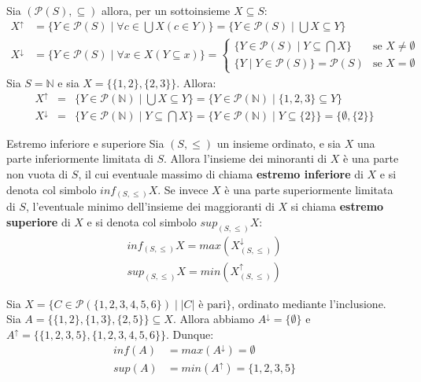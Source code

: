 \begin{example}
	Sia $(\mathcal{P}(S),\subseteq)$ allora, per un sottoinsieme $X \subseteq S$:
	\begin{eqnarray}
			X^{\uparrow} &= \{ Y \in \mathcal{P}(S) \; | \; \forall c \in \bigcup X (c \in Y) \} = \{Y \in \mathcal{P}(S) \; | \; \bigcup X \subseteq Y \}\\
			X^{\downarrow} &= \{Y \in \mathcal{P}(S) \; | \; \forall x \in X (Y \subseteq x )\} = \begin{cases}
				\{Y \in \mathcal{P}(S) \; | \; Y \subseteq \bigcap X\} & \text{se $X \neq \emptyset$}\\
				\{Y \; | \; Y \in \mathcal{P}(S) \} = \mathcal{P}(S) & \text{se $X= \emptyset$}
			\end{cases}
	\end{eqnarray}
Sia $S= \mathbb{N}$ e sia $X= \{\{1,2\},\{2,3\}\}$. Allora:
\begin{align*}
	X^{\uparrow} &=& \{Y \in \mathcal{P}(\mathbb{N}) \; | \; \bigcup X \subseteq Y \} = \{Y 	\in \mathcal{P}(\mathbb{N}) \; | \; \{1,2,3\} \subseteq Y \}\\
	X^{\downarrow} &=& \{Y \in \mathcal{P}(\mathbb{N})\; | \; Y \subseteq \bigcap X\} = \{Y \in \mathcal{P}(\mathbb{N}) \; | \; Y \subseteq \{2\} \} = \{\emptyset, \{2\}\}
\end{align*}
\end{example}

\begin{defbox}{Estremo inferiore e superiore}
	Sia $(S,\leq)$ un insieme ordinato, e sia $X$ una parte inferiormente limitata di $S$. Allora l'insieme dei minoranti di $X$ è una parte non vuota di $S$, il cui eventuale massimo di chiama \textbf{estremo inferiore} di $X$ e si denota col simbolo $inf_{(S,\leq)} X$. Se invece $X$ è una parte superiormente limitata di $S$, l'eventuale minimo dell'insieme dei maggioranti di $X$ si chiama \textbf{estremo superiore} di $X$ e si denota col simbolo $sup_{(S,\leq)} X$:
	\begin{eqnarray}
		inf_{(S,\leq)} X = max(X^{\downarrow}_{(S,\leq)})\\
		sup_{(S,\leq)} X = min(X^{\uparrow}_{(S,\leq)})
	\end{eqnarray}
\end{defbox}

\begin{example}
	Sia $X = \{C \in \mathcal{P}(\{1,2,3,4,5,6\}) \; | \; |C| \text{ è pari} \}$, ordinato mediante l'inclusione. Sia $A = \{\{1,2\},\{1,3\},\{2,5\}\} \subseteq X$. Allora abbiamo $A^{\downarrow} = \{\emptyset\}	$ e $A^{\uparrow}=\{\{1,2,3,5\},\{1,2,3,4,5,6\}\}
	$. Dunque:
\begin{align*}
	inf(A) &= max(A^{\downarrow}) = \emptyset\\
	sup(A) &= min(A^{\uparrow}) = \{1,2,3,5\}
\end{align*}
\end{example}

